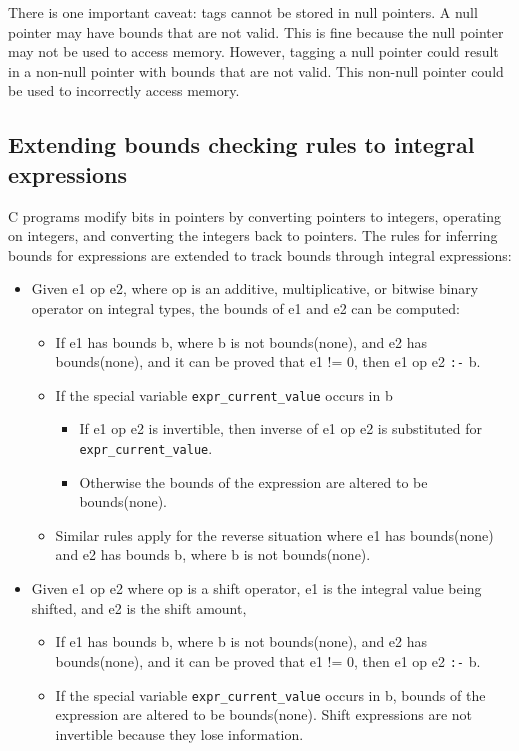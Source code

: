 There is one important caveat: tags cannot be stored in null pointers. A
null pointer may have bounds that are not valid. This is fine because
the null pointer may not be used to access memory. However, tagging a
null pointer could result in a non-null pointer with bounds that are not
valid. This non-null pointer could be used to incorrectly access memory.

\subsection{Extending bounds checking rules to integral
expressions}

C programs modify bits in pointers by converting pointers to integers,
operating on integers, and converting the integers back to pointers. The
rules for inferring bounds for expressions are extended to track bounds
through integral expressions:

\begin{itemize}
\item
  Given e1 op e2, where op is an additive, multiplicative, or bitwise
  binary operator on integral types, the bounds of e1 and e2 can be
  computed:

  \begin{itemize}
  \item
    If e1 has bounds b, where b is not bounds(none), and e2 has
    bounds(none), and it can be proved that e1 != 0, then e1 op e2
    \texttt{:-} b.
  \item
    If the special variable \texttt{expr\_current\_value} occurs in b

    \begin{itemize}
    \item
      If e1 op e2 is invertible, then inverse of e1 op e2 is substituted
      for \texttt{expr\_current\_value}.
    \item
      Otherwise the bounds of the expression are altered to be
      bounds(none).
    \end{itemize}
  \item
    Similar rules apply for the reverse situation where e1 has
    bounds(none) and e2 has bounds b, where b is not bounds(none).
  \end{itemize}
\item
  Given e1 op e2 where op is a shift operator, e1 is the integral value
  being shifted, and e2 is the shift amount,

  \begin{itemize}
  \item
    If e1 has bounds b, where b is not bounds(none), and e2 has
    bounds(none), and it can be proved that e1 != 0, then e1 op e2
    \texttt{:-} b.
  \item
    If the special variable \texttt{expr\_current\_value} occurs in b,
    bounds of the expression are altered to be bounds(none). Shift
    expressions are not invertible because they lose information.
  \end{itemize}
\end{itemize}

